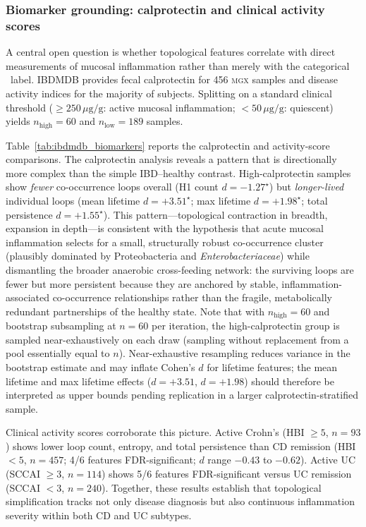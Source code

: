 \subsubsection*{Biomarker grounding: calprotectin and clinical activity scores}

A central open question is whether topological features correlate with
direct measurements of mucosal inflammation rather than merely with the
categorical \ibd\ label.
IBDMDB provides fecal calprotectin for 456 \textsc{mgx} samples and
disease activity indices for the majority of subjects.
Splitting on a standard clinical threshold
($\geq 250\,\mu\text{g/g}$: active mucosal inflammation; $<50\,\mu\text{g/g}$:
quiescent) yields $n_\text{high} = 60$ and $n_\text{low} = 189$ samples.

Table~\ref{tab:ibdmdb_biomarkers} reports the calprotectin and activity-score
comparisons.
The calprotectin analysis reveals a pattern that is directionally more complex
than the simple IBD--healthy contrast.
High-calprotectin samples show \emph{fewer} co-occurrence loops overall
(H1 count $d = -1.27^\star$) but \emph{longer-lived} individual loops
(mean lifetime $d = +3.51^\star$; max lifetime $d = +1.98^\star$; total
persistence $d = +1.55^\star$).
This pattern---topological contraction in breadth, expansion in depth---is
consistent with the hypothesis that acute mucosal inflammation selects for
a small, structurally robust co-occurrence cluster (plausibly dominated by
Proteobacteria and \textit{Enterobacteriaceae}) while dismantling the broader
anaerobic cross-feeding network: the surviving loops are fewer but more
persistent because they are anchored by stable, inflammation-associated
co-occurrence relationships rather than the fragile, metabolically redundant
partnerships of the healthy state.
Note that with $n_\text{high} = 60$ and bootstrap subsampling at $n = 60$
per iteration, the high-calprotectin group is sampled near-exhaustively on
each draw (sampling without replacement from a pool essentially equal to $n$).
Near-exhaustive resampling reduces variance in the bootstrap estimate and
may inflate Cohen's $d$ for lifetime features; the mean lifetime and
max lifetime effects ($d = +3.51$, $d = +1.98$) should therefore be
interpreted as upper bounds pending replication in a larger calprotectin-stratified
sample.

Clinical activity scores corroborate this picture.
Active Crohn's (HBI $\geq 5$, $n = 93$) shows lower loop count, entropy,
and total persistence than CD remission (HBI $< 5$, $n = 457$; 4/6 features
FDR-significant; $d$ range $-0.43$ to $-0.62$).
Active UC (SCCAI $\geq 3$, $n = 114$) shows 5/6 features FDR-significant
versus UC remission (SCCAI $< 3$, $n = 240$).
Together, these results establish that topological simplification tracks not
only disease diagnosis but also continuous inflammation severity within both
CD and UC subtypes.

